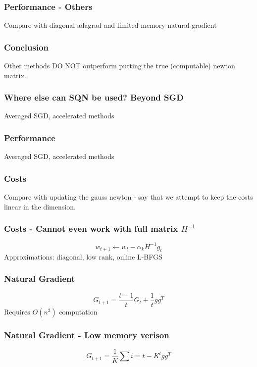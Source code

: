 \documentclass{beamer}
\begin{document}
\begin{frame}
	\frametitle{Performance - Others }
	Compare with diagonal adagrad and limited memory natural gradient
\end{frame}

\begin{frame}
	\frametitle{Conclusion}
	Other methods DO NOT outperform putting the true (computable) newton matrix. 
	
\end{frame}

\begin{frame}
	\frametitle{Where else can SQN be used? Beyond SGD}
	Averaged SGD, accelerated methods
\end{frame}

\begin{frame}
	\frametitle{Performance}
	Averaged SGD, accelerated methods
\end{frame}


\begin{frame}
	\frametitle{Costs}
	Compare with updating the gauss newton - say that we attempt to keep the costs linear in the dimension.
\end{frame}


\begin{frame}
	\frametitle{Costs - Cannot even work with full matrix $H^{-1}$}
	\[
	w_{t+1} \leftarrow w_{t} - \alpha_k H^{-1} g_t
	\]
	Approximations: diagonal, low rank, online L-BFGS
\end{frame}
 

	\begin{frame}
		\frametitle{Natural Gradient}
		\[
			G_{t+1} = \frac{t-1}{t}G_t + \frac{1}{t} g g^T
		\]
		Requires $O(n^2)$ computation 
	\end{frame}
	

	\begin{frame}
		\frametitle{Natural Gradient - Low memory verison}
		\[
			G_{t+1} = \frac{1}{K} \sum{i=t-K}^{t} g g^T 
		\]
	\end{frame}
\end{document}
